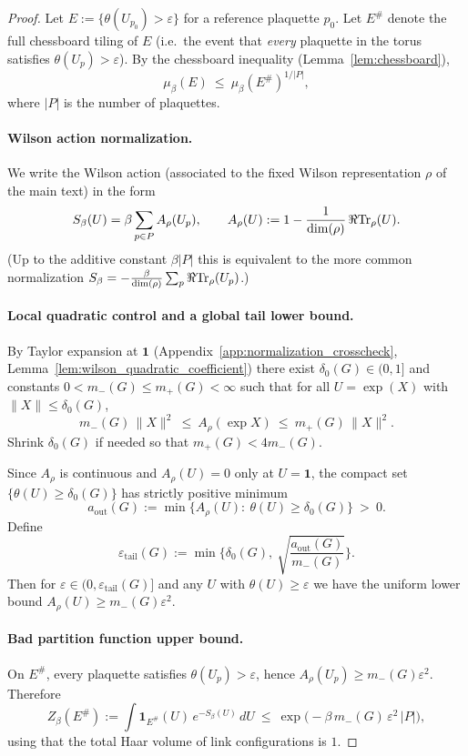 \begin{proof}
Let $E:=\{\theta(U_{p_0})>\varepsilon\}$ for a reference plaquette $p_0$.
Let $E^{\#}$ denote the full chessboard tiling of $E$ (i.e.\ the event that \emph{every} plaquette in the torus satisfies $\theta(U_p)>\varepsilon$).
By the chessboard inequality (Lemma~\ref{lem:chessboard}),
\begin{equation}\label{eq:chess_tail_step}
\mu_\beta(E)\ \le\ \mu_\beta(E^{\#})^{1/|P|},
\end{equation}
where $|P|$ is the number of plaquettes.

\paragraph{Wilson action normalization.}
We write the Wilson action (associated to the fixed Wilson representation $\rho$ of the main text) in the form
\[
S_\beta(U)=\beta\sum_{p\in P}A_\rho(U_p),
\qquad
A_\rho(U):=1-\frac{1}{\dim(\rho)}\,\Re\mathrm{Tr}_{\rho}(U).
\]
(Up to the additive constant $\beta|P|$ this is equivalent to the more common normalization
$S_\beta= -\frac{\beta}{\dim(\rho)}\sum_p \Re\mathrm{Tr}_{\rho}(U_p)$.)

\paragraph{Local quadratic control and a global tail lower bound.}
By Taylor expansion at $\mathbf 1$ (Appendix~\ref{app:normalization_crosscheck}, Lemma~\ref{lem:wilson_quadratic_coefficient})
there exist $\delta_0(G)\in(0,1]$ and constants $0<m_-(G)\le m_+(G)<\infty$ such that for all $U=\exp(X)$ with $\|X\|\le \delta_0(G)$,
\[
m_-(G)\,\|X\|^2\ \le\ A_\rho(\exp X)\ \le\ m_+(G)\,\|X\|^2.
\]
Shrink $\delta_0(G)$ if needed so that $m_+(G)<4m_-(G)$.

Since $A_\rho$ is continuous and $A_\rho(U)=0$ only at $U=\mathbf 1$, the compact set $\{\theta(U)\ge \delta_0(G)\}$ has strictly positive minimum
\[
a_{\mathrm{out}}(G):=\min\{A_\rho(U):\ \theta(U)\ge \delta_0(G)\}\ >\ 0.
\]
Define
\[
\varepsilon_{\mathrm{tail}}(G):=\min\Big\{\delta_0(G),\ \sqrt{\frac{a_{\mathrm{out}}(G)}{m_-(G)}}\Big\}.
\]
Then for $\varepsilon\in(0,\varepsilon_{\mathrm{tail}}(G)]$ and any $U$ with $\theta(U)\ge\varepsilon$ we have the uniform lower bound
$A_\rho(U)\ge m_-(G)\varepsilon^2$.

\paragraph{Bad partition function upper bound.}
On $E^{\#}$, every plaquette satisfies $\theta(U_p)>\varepsilon$, hence $A_\rho(U_p)\ge m_-(G)\varepsilon^2$.
Therefore
\begin{equation}\label{eq:Z_bad_upper}
Z_\beta(E^{\#})
:=\int \mathbf 1_{E^{\#}}(U)\,e^{-S_\beta(U)}\,dU
\ \le\
\exp\!\Big(-\beta\,m_-(G)\,\varepsilon^2\,|P|\Big),
\end{equation}
using that the total Haar volume of link configurations is $1$.


\end{proof}
